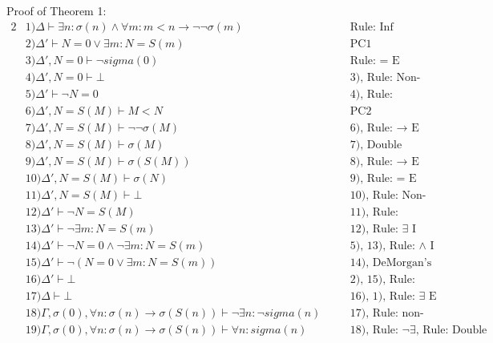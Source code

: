 \documentclass[article]{journal}
\newcommand{\justif}[2]{&{#1}&\text{#2}}
\begin{document}
Proof of Theorem 1:
\begin{alignat*}{2}
&1) \Delta \vdash \exists n: \sigma(n) \wedge \forall m: m < n \to \lnot\lnot\sigma(m)		\justif{\quad}{Rule: Inf}\\
&2) \Delta' \vdash N=0 \vee \exists m: N = S(m)		\justif{\quad}{PC1}\\
&3) \Delta', N=0 \vdash \lnot sigma(0)				\justif{\quad}{Rule: = E}\\
&4) \Delta', N=0 \vdash \bot                			\justif{\quad}{3), Rule: Non-contradiction}\\
&5) \Delta' \vdash \lnot N=0							\justif{\quad}{4), Rule: Reductio ad absurdum}\\
&6) \Delta', N=S(M) \vdash M < N						\justif{\quad}{PC2}\\  
&7) \Delta', N=S(M) \vdash \lnot\lnot\sigma(M) 		\justif{\quad}{6), Rule: $\to$ E}\\
&8) \Delta', N=S(M) \vdash \sigma(M) 				\justif{\quad}{7), Double Negation}\\
&9) \Delta', N=S(M) \vdash \sigma(S(M)) 				\justif{\quad}{8), Rule: $\to$ E}\\
&10) \Delta', N=S(M) \vdash \sigma(N) 				\justif{\quad}{9), Rule: = E}\\
&11) \Delta', N=S(M) \vdash \bot 					\justif{\quad}{10), Rule: Non-contradiction}\\
&12) \Delta' \vdash \lnot N=S(M) 					\justif{\quad}{11), Rule: Reductio ad absurdum}\\
&13) \Delta' \vdash \lnot\exists m: N=S(m) 			\justif{\quad}{12), Rule: $\exists$ I}\\
&14) \Delta' \vdash \lnot N=0 \wedge \lnot\exists m: N=S(m) 		\justif{\quad}{5), 13), Rule: $\wedge$ I}\\
&15) \Delta' \vdash \lnot (N=0 \vee \exists m: N=S(m)) 			\justif{\quad}{14), DeMorgan's Theorem}\\
&16) \Delta' \vdash \bot 							\justif{\quad}{2), 15), Rule: Non-contradiction}\\
&17) \Delta \vdash \bot 								\justif{\quad}{16), 1), Rule: $\exists$ E}\\
&18) \Gamma, \sigma(0), \forall n: \sigma(n) \to \sigma(S(n)) \vdash \lnot \exists n: \lnot sigma(n) \justif{\quad}{17), Rule: non-contradiction}\\
&19) \Gamma, \sigma(0), \forall n: \sigma(n) \to \sigma(S(n)) \vdash \forall n: sigma(n) \justif{\quad}{18), Rule: $\lnot \exists$, Rule: Double Negation}
\end{alignat*}
\end{document}
